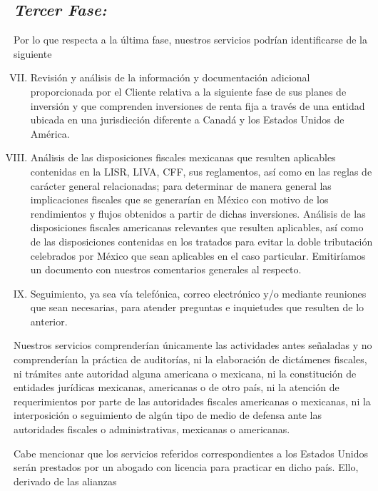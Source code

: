 \documentclass[5pt,letter]{report}
\begin{document}
\subsection*{\it Tercer Fase:} %
Por lo que respecta a la última fase, nuestros servicios podrían identificarse de la siguiente 
\begin{enumerate}[I.]
\setcounter{enumi}{6}
\item 
Revisión y análisis de la información y documentación adicional proporcionada por el 
Cliente relativa a la siguiente fase de sus planes de inversión y que comprenden 
inversiones de renta fija a través de una entidad ubicada en una jurisdicción diferente a 
Canadá y los Estados Unidos de América. 
\item 
Análisis de las disposiciones fiscales mexicanas que resulten aplicables contenidas en la 
LISR, LIVA, CFF, sus reglamentos, así como en las reglas de carácter general relacionadas; 
para determinar de manera general las implicaciones fiscales que se generarían en 
México con motivo de los rendimientos y flujos obtenidos a partir de dichas inversiones. 
Análisis de las disposiciones fiscales americanas relevantes que resulten aplicables, así 
como de las disposiciones contenidas en los tratados para evitar la doble tributación 
celebrados por México que sean aplicables en el caso particular. Emitiríamos un 
documento con nuestros comentarios generales al respecto.  
\item 
Seguimiento, ya sea vía telefónica, correo electrónico y/o mediante reuniones que sean 
necesarias, para atender preguntas e inquietudes que resulten de lo anterior. 
\end{enumerate}
 

Nuestros servicios comprenderían únicamente las actividades antes señaladas y no 
comprenderían la práctica de auditorías, ni la elaboración de dictámenes fiscales, ni trámites 
ante autoridad alguna americana o mexicana, ni la constitución de entidades jurídicas 
mexicanas, americanas o de otro país, ni la atención de requerimientos por parte de las 
autoridades fiscales americanas o mexicanas, ni la interposición o seguimiento de algún tipo de 
medio de defensa ante las autoridades fiscales o administrativas, mexicanas o americanas.  
 
Cabe mencionar que los servicios referidos correspondientes a los Estados Unidos serán 
prestados por un abogado con licencia para practicar en dicho país. Ello, derivado de las alianzas 
\end{document}
